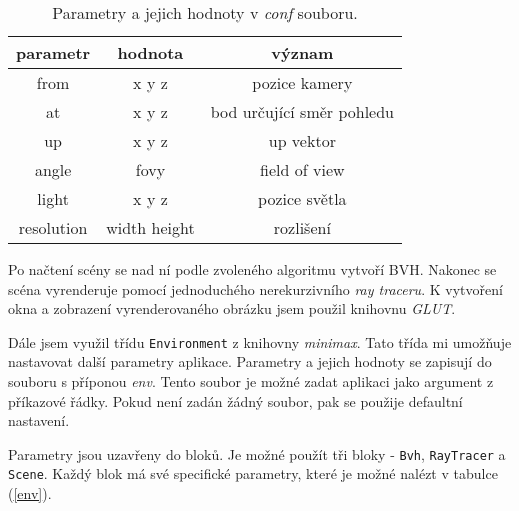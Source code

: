 \documentclass[11pt]{article}
\begin{document}
\begin{table}[h]
\begin{center}
\begin{tabular}{|c|c|c|}
\hline
\textbf{parametr} & \textbf{hodnota} & \textbf{význam}\\
\hline
from & x y z & pozice kamery\\
\hline
at & x y z & bod určující směr pohledu\\
\hline
up & x y z & up vektor\\
\hline
angle & fovy & field of view\\
\hline
light & x y z & pozice světla\\
\hline
resolution & width height & rozlišení\\
\hline
\end{tabular}
\end{center}
\caption{Parametry a jejich hodnoty v \emph{conf} souboru.}
\label{conf}
\end{table}

Po načtení scény se nad ní podle zvoleného algoritmu vytvoří BVH. Nakonec se scéna vyrenderuje pomocí jednoduchého nerekurzivního \emph{ray traceru}. K vytvoření okna a zobrazení vyrenderovaného obrázku jsem použil knihovnu \emph{GLUT}.

Dále jsem využil třídu \verb!Environment! z knihovny \emph{minimax}. Tato třída mi umožňuje nastavovat další parametry aplikace. Parametry a jejich hodnoty se zapisují do souboru s příponou \emph{env}. Tento soubor je možné zadat aplikaci jako argument z příkazové řádky. Pokud není zadán žádný soubor, pak se použije defaultní nastavení.

Parametry jsou uzavřeny do bloků. Je možné použít tři bloky - \verb!Bvh!, \verb!RayTracer! a \verb!Scene!. Každý blok má své specifické parametry, které je možné nalézt v tabulce (\ref{env}).
\end{document}
